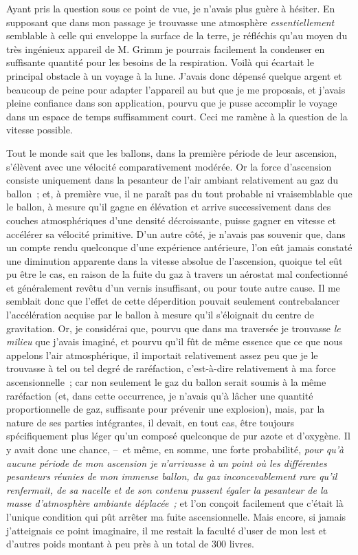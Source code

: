 \documentclass[french,twoside]{book} %
\begin{document}
Ayant pris la question sous ce point de vue, je n’avais plus guère à hésiter. En supposant que dans mon passage je trouvasse une atmosphère\emph{ essentiellement} semblable à celle qui enveloppe la surface de la terre, je réfléchis qu’au moyen du très ingénieux appareil de M. Grimm je pourrais facilement la condenser en suffisante quantité pour les besoins de la respiration. Voilà qui écartait le principal obstacle à un voyage à la lune. J’avais donc dépensé quelque argent et beaucoup de peine pour adapter l’appareil au but que je me proposais, et j’avais pleine confiance dans son application, pourvu que je pusse accomplir le voyage dans un espace de temps suffisamment court. Ceci me ramène à la question de la vitesse possible.\par
Tout le monde sait que les ballons, dans la première période de leur ascension, s’élèvent avec une vélocité comparativement modérée. Or la force d’ascension consiste uniquement dans la pesanteur de l’air ambiant relativement au gaz du ballon ; et, à première vue, il ne paraît pas du tout probable ni vraisemblable que le ballon, à mesure qu’il gagne en élévation et arrive successivement dans des couches atmosphériques d’une densité décroissante, puisse gagner en vitesse et accélérer sa vélocité primitive. D’un autre côté, je n’avais pas souvenir que, dans un compte rendu quelconque d’une expérience antérieure, l’on eût jamais constaté une diminution apparente dans la vitesse absolue de l’ascension, quoique tel eût pu être le cas, en raison de la fuite du gaz à travers un aérostat mal confectionné et généralement revêtu d’un vernis insuffisant, ou pour toute autre cause. Il me semblait donc que l’effet de cette déperdition pouvait seulement contrebalancer l’accélération acquise par le ballon à mesure qu’il s’éloignait du centre de gravitation. Or, je considérai que, pourvu que dans ma traversée je trouvasse \emph{le milieu} que j’avais imaginé, et pourvu qu’il fût de même essence que ce que nous appelons l’air atmosphérique, il importait relativement assez peu que je le trouvasse à tel ou tel degré de raréfaction, c’est-à-dire relativement à ma force ascensionnelle ; car non seulement le gaz du ballon serait soumis à la même raréfaction (et, dans cette occurrence, je n’avais qu’à lâcher une quantité proportionnelle de gaz, suffisante pour prévenir une explosion), mais, par la nature de ses parties intégrantes, il devait, en tout cas, être toujours spécifiquement plus léger qu’un composé quelconque de pur azote et d’oxygène. Il y avait donc une chance, – et même, en somme, une forte probabilité, \emph{pour qu’à aucune période de mon ascension je n’arrivasse à un point où les différentes pesanteurs réunies de mon immense ballon, du gaz inconcevablement rare qu’il renfermait, de sa nacelle et de son contenu pussent égaler la pesanteur de la masse d’atmosphère ambiante déplacée ;} et l’on conçoit facilement que c’était là l’unique condition qui pût arrêter ma fuite ascensionnelle. Mais encore, si jamais j’atteignais ce point imaginaire, il me restait la faculté d’user de mon lest et d’autres poids montant à peu près à un total de 300 livres.\par
\end{document}
